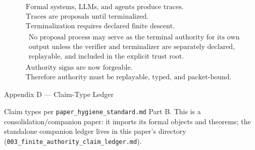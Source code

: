 \documentclass[
  10pt,
]{article}
\DeclareRobustCommand{\texttt}[1]{{\paperSymbolFont\nolinkurl{#1}}}
\begin{document}
\protect\hypertarget{math-E0181-0255}{}{\[
\boxed{
\begin{aligned}
&\text{Formal systems, LLMs, and agents produce traces.}\\
&\text{Traces are proposals until terminalized.}\\
&\text{Terminalization requires declared finite descent.}\\
&\begin{gathered}\text{No proposal process may serve as the terminal authority for its own}\\
\text{output unless the verifier and terminalizer are separately declared,}\\
\text{replayable, and included in the explicit trust root.}\end{gathered}\\
&\text{Authority signs are now forgeable.}\\
&\text{Therefore authority must be replayable, typed, and packet-bound.}
\end{aligned}
}
\]}

Appendix D --- Claim-Type Ledger

Claim types per \texttt{paper\_hygiene\_standard.md} Part B. This is a consolidation/companion paper: it imports its formal objects and theorems; the standalone companion ledger lives in this paper's directory (\texttt{003\_finite\_authority\_claim\_ledger.md}).
\end{document}
